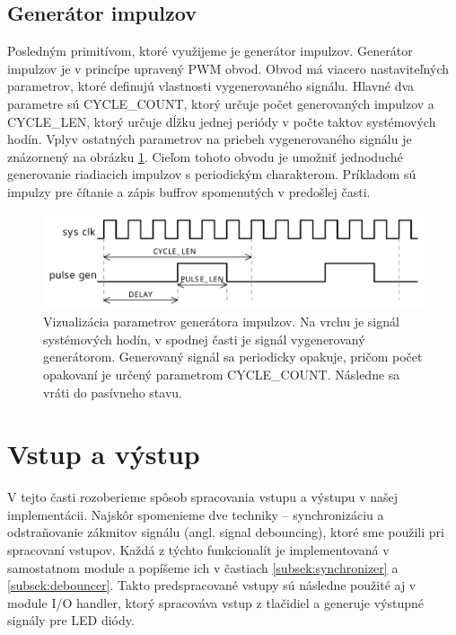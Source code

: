 \subsection{Generátor impulzov}
Posledným primitívom, ktoré využijeme je generátor impulzov. Generátor impulzov je v princípe upravený PWM obvod. Obvod má viacero nastaviteľných parametrov, ktoré definujú vlastnosti vygenerovaného signálu. Hlavné dva parametre sú CYCLE\_COUNT, ktorý určuje počet generovaných impulzov a CYCLE\_LEN, ktorý určuje dĺžku jednej periódy v počte taktov systémových hodín. Vplyv ostatných parametrov na priebeh vygenerovaného signálu je znázornený na obrázku \ref{obr:pulseGen}. Cieľom tohoto obvodu je umožniť jednoduché generovanie riadiacich impulzov s periodickým charakterom. Príkladom sú impulzy pre čítanie a zápis buffrov spomenutých v predošlej časti.

\begin{figure}
    \centerline{\includegraphics[width=1\textwidth]{images/signals/pulseGen.pdf}}
    \caption[Vizualizácia parametrov generátora impulzov]{Vizualizácia parametrov generátora impulzov. Na vrchu je signál systémových hodín, v spodnej časti je signál vygenerovaný generátorom. Generovaný signál sa periodicky opakuje, pričom počet opakovaní je určený parametrom CYCLE\_COUNT. Následne sa vráti do pasívneho stavu.}
    \label{obr:pulseGen}
\end{figure}

\section{Vstup a výstup}
V tejto časti rozoberieme spôsob spracovania vstupu a výstupu v našej implementácii. Najskôr spomenieme dve techniky -- synchronizáciu a odstraňovanie zákmitov signálu (angl. signal debouncing), ktoré sme použili pri spracovaní vstupov. Každá z týchto funkcionalít je implementovaná v samostatnom module a popíšeme ich v častiach \ref{subsek:synchronizer} a \ref{subsek:debouncer}. Takto predspracované vstupy sú následne použité aj v module I/O handler, ktorý spracováva vstup z tlačidiel a generuje výstupné signály pre LED diódy.

